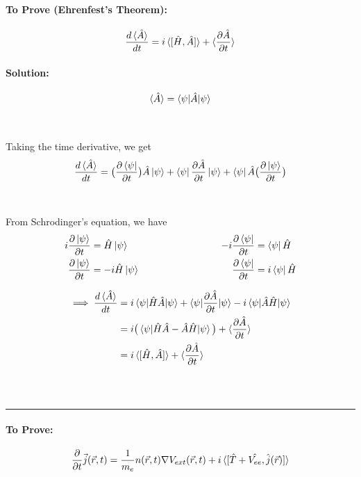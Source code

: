 \documentclass[12pt]{article}
\begin{document}
\paragraph{To Prove (Ehrenfest's Theorem):}
\[ \frac{d\braket{\hat{A}}}{dt} = i\braket{[\hat{H},\hat{A}]} + \braket{\frac{\partial \hat{A}}{\partial t}}\]

\paragraph{Solution:}
\[ \braket{\hat{A}} = \braket{\psi|\hat{A}|\psi}\]
\\
\\
Taking the time derivative, we get
\[ \frac{d\braket{\hat{A}}}{dt} = \big(\frac{\partial \bra{\psi}}{\partial t} \big) \hat{A} \ket{\psi} + 
\bra{\psi} \frac{\partial \hat{A}}{\partial t} \ket{\psi} + \bra{\psi} \hat{A} \big(\frac{\partial \ket{\psi}}{\partial t} \big) \]
\\
\\
From Schrodinger's equation, we have 
\[
\begin{aligned}
    i \frac{\partial \ket{\psi}}{\partial t} &= \hat{H} \ket{\psi} \\
    \frac{\partial \ket{\psi}}{\partial t} &= -i \hat{H} \ket{\psi}
\end{aligned}
\hspace{3cm}
\begin{aligned}
    -i \frac{\partial \bra{\psi}}{\partial t} &= \bra{\psi}\hat{H} \\
    \frac{\partial \bra{\psi}}{\partial t} &= i \bra{\psi}\hat{H}
\end{aligned}
\]

\begin{align*}
\implies \frac{d\braket{\hat{A}}}{dt} &= i \braket{\psi|\hat{H}\hat{A}|\psi} + 
\braket{\psi|\frac{\partial \hat{A}}{\partial t}|\psi} - i\braket{\psi|\hat{A}\hat{H}|\psi} \\
&= i \big( \braket{\psi|\hat{H}\hat{A} - \hat{A}\hat{H}|\psi} \big) + \braket{\frac{\partial \hat{A}}{\partial t}} \\
&= i \braket{[\hat{H},\hat{A}]} + \braket{\frac{\partial \hat{A}}{\partial t}} 
\end{align*}
\\
\\
\hrule
\paragraph{To Prove:}
\[ \frac{\partial}{\partial t}\vec{j}(\vec{r},t) = \frac{1}{m_e} n(\vec{r},t) \nabla  V_{ext}(\vec{r},t) 
+ i \braket{[\hat{T} + \hat{V_{ee}},\hat{j}(\vec{r})]} \]
\end{document}
